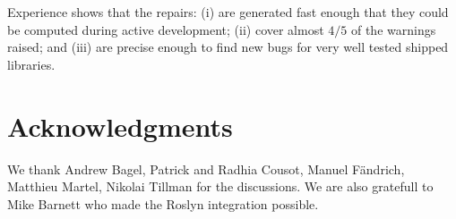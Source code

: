 \documentclass[10pt]{sigplanconf}
\begin{document}
Experience shows that the repairs: (i) are generated
fast enough that they could be computed during active development; (ii)
cover almost  $4/5$ of the warnings raised; and (iii) are precise
enough to find new bugs for very well tested shipped libraries.



\section*{Acknowledgments}
We thank Andrew Bagel, Patrick and Radhia Cousot, Manuel F\"andrich, Matthieu Martel, Nikolai Tillman for the discussions.
We are also gratefull to Mike Barnett who made the Roslyn integration possible.



\end{document}
